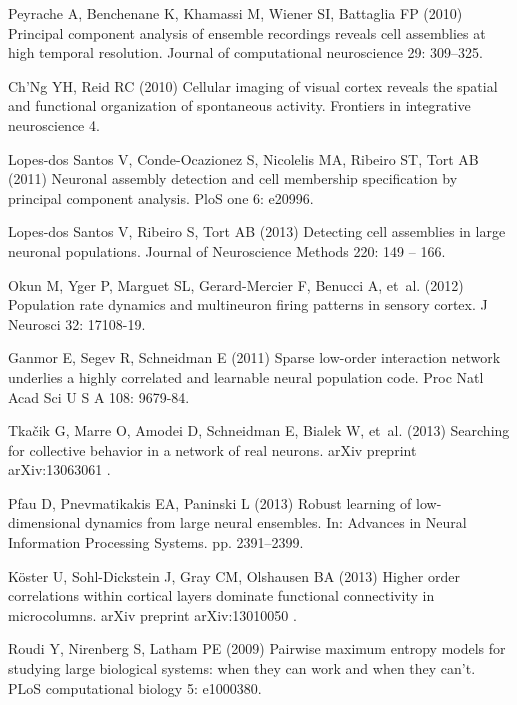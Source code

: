 \begin{thebibliography}{100}
Peyrache A, Benchenane K, Khamassi M, Wiener SI, Battaglia FP (2010) Principal
  component analysis of ensemble recordings reveals cell assemblies at high
  temporal resolution.
\newblock Journal of computational neuroscience 29: 309--325.

Ch'Ng YH, Reid RC (2010) Cellular imaging of visual cortex reveals the spatial
  and functional organization of spontaneous activity.
\newblock Frontiers in integrative neuroscience 4.

Lopes-dos Santos V, Conde-Ocazionez S, Nicolelis MA, Ribeiro ST, Tort AB (2011)
  Neuronal assembly detection and cell membership specification by principal
  component analysis.
\newblock PloS one 6: e20996.

Lopes-dos Santos V, Ribeiro S, Tort AB (2013) Detecting cell assemblies in
  large neuronal populations.
\newblock Journal of Neuroscience Methods 220: 149 -- 166.

Okun M, Yger P, Marguet SL, Gerard-Mercier F, Benucci A, et~al. (2012)
  Population rate dynamics and multineuron firing patterns in sensory cortex.
\newblock J Neurosci 32: 17108-19.

Ganmor E, Segev R, Schneidman E (2011) Sparse low-order interaction network
  underlies a highly correlated and learnable neural population code.
\newblock Proc Natl Acad Sci U S A 108: 9679-84.

Tka{\v{c}}ik G, Marre O, Amodei D, Schneidman E, Bialek W, et~al. (2013)
  Searching for collective behavior in a network of real neurons.
\newblock arXiv preprint arXiv:13063061 .

Pfau D, Pnevmatikakis EA, Paninski L (2013) Robust learning of low-dimensional
  dynamics from large neural ensembles.
\newblock In: Advances in Neural Information Processing Systems. pp.
  2391--2399.

K{\"o}ster U, Sohl-Dickstein J, Gray CM, Olshausen BA (2013) Higher order
  correlations within cortical layers dominate functional connectivity in
  microcolumns.
\newblock arXiv preprint arXiv:13010050 .

Roudi Y, Nirenberg S, Latham PE (2009) Pairwise maximum entropy models for
  studying large biological systems: when they can work and when they can't.
\newblock PLoS computational biology 5: e1000380.


\end{thebibliography}
